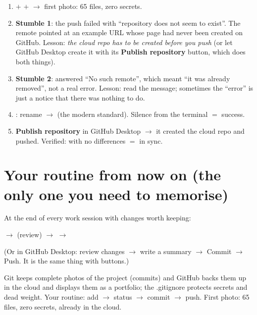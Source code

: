 \documentclass[11pt,a4paper]{article}
\begin{document}
\begin{enumerate}
  \item {} $+$  $+$  $\rightarrow$ first
        photo: 65 files, zero secrets.
  \item \textbf{Stumble 1}: the push failed with ``repository does not seem to exist''. The
        remote pointed at an example URL whose page had never been created on GitHub. Lesson:
        \emph{the cloud repo has to be created before you push} (or let GitHub Desktop create
        it with its \textbf{Publish repository} button, which does both things).
  \item \textbf{Stumble 2}:  answered ``No such remote'',
        which meant ``it was already removed'', not a real error. Lesson: read the message;
        sometimes the ``error'' is just a notice that there was nothing to do.
  \item {}: rename  $\rightarrow$  (the
        modern standard). Silence from the terminal $=$ success.
  \item \textbf{Publish repository} in GitHub Desktop $\rightarrow$ it created the cloud repo
        and pushed. Verified:  with no differences $=$ in sync.
\end{enumerate}

\section{Your routine from now on (the only one you need to memorise)}

At the end of every work session with changes worth keeping:
\begin{center}
 \quad$\rightarrow$\quad {} (review) \quad$\rightarrow$\quad
{} \quad$\rightarrow$\quad {}
\end{center}
(Or in GitHub Desktop: review changes $\rightarrow$ write a summary $\rightarrow$ Commit
$\rightarrow$ Push. It is the same thing with buttons.)

\begin{resumen}
Git keeps complete photos of the project (commits) and GitHub backs them up in the cloud and
displays them as a portfolio; the .gitignore protects secrets and dead weight. Your routine:
add $\rightarrow$ status $\rightarrow$ commit $\rightarrow$ push. First photo: 65 files, zero
secrets, already in the cloud.
\end{resumen}
\clearpage
{}
{}
\end{document}
